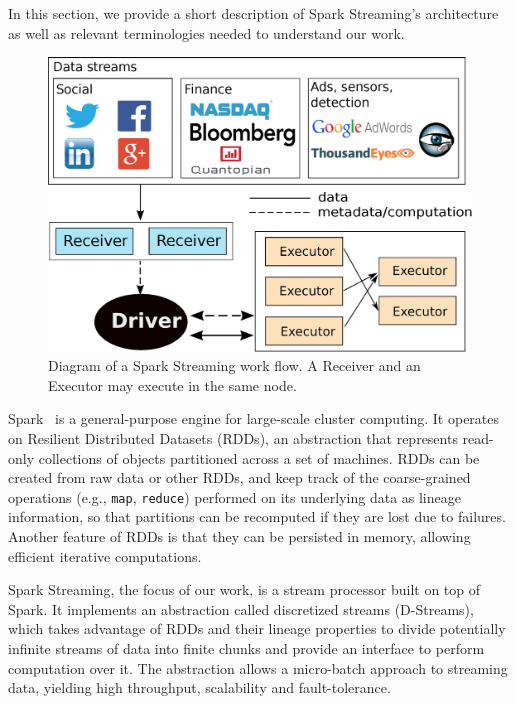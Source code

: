 In this section, we provide a short description of Spark Streaming's architecture as well as relevant terminologies needed to understand our work.

\begin{figure}[t!]
  \begin{center}
    \includegraphics[scale=0.35]{images_graphs/spark_architecture_v4.eps}
  \end{center}
  \caption{Diagram of a Spark Streaming work flow. A Receiver and an Executor may execute in the same node.}
  \label{fig:SparkStreaming_architecture}
\end{figure}

Spark~\cite{Spark} is a general-purpose engine for large-scale cluster computing. It operates on Resilient Distributed Datasets (RDDs), an abstraction that represents read-only collections of objects partitioned across a set of machines. RDDs can be created from raw data or other RDDs, and keep track of the coarse-grained operations (e.g., \texttt{map}, \texttt{reduce}) performed on its underlying data as lineage information, so that partitions can be recomputed if they are lost due to failures. 
Another feature of RDDs is that they can be persisted in memory, allowing efficient iterative computations.

Spark Streaming, the focus of our work, is a stream processor built on top of Spark.
It implements an abstraction called discretized streams (D-Streams), which takes advantage of RDDs and their lineage properties to divide potentially infinite streams of data into finite chunks and provide an interface to perform computation over it.
The abstraction allows a micro-batch approach to streaming data, yielding high throughput, scalability and fault-tolerance.


